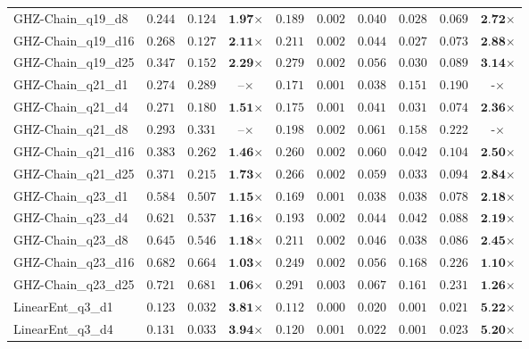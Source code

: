 \begin{table*}[t]
{\begin{tabular}{| l || r r c || r r r r r c |}
GHZ-Chain\_q19\_d8 & $0.244$ & $0.124$ & $\textbf{1.97}$$\times$ & $0.189$ & $0.002$ & $0.040$ & $0.028$ & $0.069$ & $\textbf{2.72}$$\times$ \\
GHZ-Chain\_q19\_d16 & $0.268$ & $0.127$ & $\textbf{2.11}$$\times$ & $0.211$ & $0.002$ & $0.044$ & $0.027$ & $0.073$ & $\textbf{2.88}$$\times$ \\
GHZ-Chain\_q19\_d25 & $0.347$ & $0.152$ & $\textbf{2.29}$$\times$ & $0.279$ & $0.002$ & $0.056$ & $0.030$ & $0.089$ & $\textbf{3.14}$$\times$ \\
GHZ-Chain\_q21\_d1 & $0.274$ & $0.289$ & $\textbf{--}$$\times$ & $0.171$ & $0.001$ & $0.038$ & $0.151$ & $0.190$ & $\textbf{-}$$\times$ \\
GHZ-Chain\_q21\_d4 & $0.271$ & $0.180$ & $\textbf{1.51}$$\times$ & $0.175$ & $0.001$ & $0.041$ & $0.031$ & $0.074$ & $\textbf{2.36}$$\times$ \\
GHZ-Chain\_q21\_d8 & $0.293$ & $0.331$ & $\textbf{--}$$\times$ & $0.198$ & $0.002$ & $0.061$ & $0.158$ & $0.222$ & $\textbf{-}$$\times$ \\
GHZ-Chain\_q21\_d16 & $0.383$ & $0.262$ & $\textbf{1.46}$$\times$ & $0.260$ & $0.002$ & $0.060$ & $0.042$ & $0.104$ & $\textbf{2.50}$$\times$ \\
GHZ-Chain\_q21\_d25 & $0.371$ & $0.215$ & $\textbf{1.73}$$\times$ & $0.266$ & $0.002$ & $0.059$ & $0.033$ & $0.094$ & $\textbf{2.84}$$\times$ \\
GHZ-Chain\_q23\_d1 & $0.584$ & $0.507$ & $\textbf{1.15}$$\times$ & $0.169$ & $0.001$ & $0.038$ & $0.038$ & $0.078$ & $\textbf{2.18}$$\times$ \\
GHZ-Chain\_q23\_d4 & $0.621$ & $0.537$ & $\textbf{1.16}$$\times$ & $0.193$ & $0.002$ & $0.044$ & $0.042$ & $0.088$ & $\textbf{2.19}$$\times$ \\
GHZ-Chain\_q23\_d8 & $0.645$ & $0.546$ & $\textbf{1.18}$$\times$ & $0.211$ & $0.002$ & $0.046$ & $0.038$ & $0.086$ & $\textbf{2.45}$$\times$ \\
GHZ-Chain\_q23\_d16 & $0.682$ & $0.664$ & $\textbf{1.03}$$\times$ & $0.249$ & $0.002$ & $0.056$ & $0.168$ & $0.226$ & $\textbf{1.10}$$\times$ \\
GHZ-Chain\_q23\_d25 & $0.721$ & $0.681$ & $\textbf{1.06}$$\times$ & $0.291$ & $0.003$ & $0.067$ & $0.161$ & $0.231$ & $\textbf{1.26}$$\times$ \\
LinearEnt\_q3\_d1 & $0.123$ & $0.032$ & $\textbf{3.81}$$\times$ & $0.112$ & $0.000$ & $0.020$ & $0.001$ & $0.021$ & $\textbf{5.22}$$\times$ \\
LinearEnt\_q3\_d4 & $0.131$ & $0.033$ & $\textbf{3.94}$$\times$ & $0.120$ & $0.001$ & $0.022$ & $0.001$ & $0.023$ & $\textbf{5.20}$$\times$ \\

\end{tabular}}
\end{table*}
